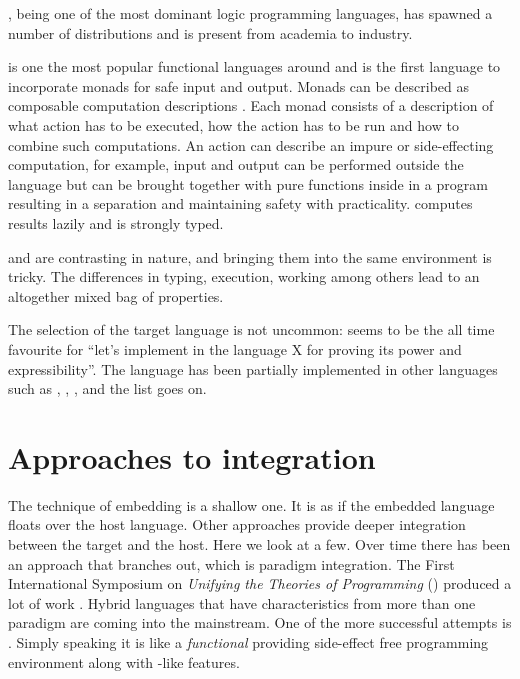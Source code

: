\documentclass[thesis-solanki.tex]{subfiles}
\begin{document}
 \cite{wikiprolog}, being one of the most dominant logic programming languages, has spawned a
number of distributions and is present from academia to industry.

 is one the most popular \cite{website:langpop} functional languages around and is the first
language to incorporate monads \cite{wadler1992comprehending} for safe input and output.
Monads can be described as composable computation descriptions \cite{website:monadshaskellorg}.
Each monad consists of a description of what action has to be executed, how the action has to be run and how to
combine such computations.
An action can describe an impure or side-effecting computation, for example, input and output can be performed
outside the language but can be brought together with pure functions inside in a program resulting in a separation
and maintaining safety with practicality.
 computes results lazily and is strongly typed.

 and  are contrasting in nature, and bringing them into the same environment is
tricky.
The differences in typing, execution, working among others lead to an altogether mixed bag of properties.


The selection of the target language is not uncommon:  seems to be the all time favourite for
``let's implement  in the language X for proving its power and expressibility''.
The  language has been partially implemented \cite{swipembedd} in other languages such as
 \cite{racklog}, 
\cite{komorowski1982qlog,robinson1982loglisp,robinson1980loglisp},  \cite{wikiprolog, jlog},
 \cite{jscriptlog} and the list \cite{yieldprolog} goes on.

\section{Approaches to integration}\label{background:approachestointegration}

The technique of embedding is a shallow one.
It is as if the embedded language floats over the host language.
Other approaches provide deeper integration between the target and the host.
Here we look at a few.
Over time there has been an approach that branches out, which is paradigm integration.
The First International Symposium on \textit{Unifying the Theories of Programming}
    \textup{(\cite{DBLP:conf/utp/2006})}
    produced a lot of work
    \textup{\cite{DBLP:conf/utp/2008,DBLP:conf/utp/2010,DBLP:conf/utp/2012,hoare1998unifying,
      gibbons2013unifying}}.
Hybrid languages that have characteristics from more than one paradigm are coming into the mainstream.
One of the more successful attempts is  \cite{website:scala}.
Simply speaking it is like a \textit{functional}  providing side-effect free programming environment
along with -like features.
\end{document}
